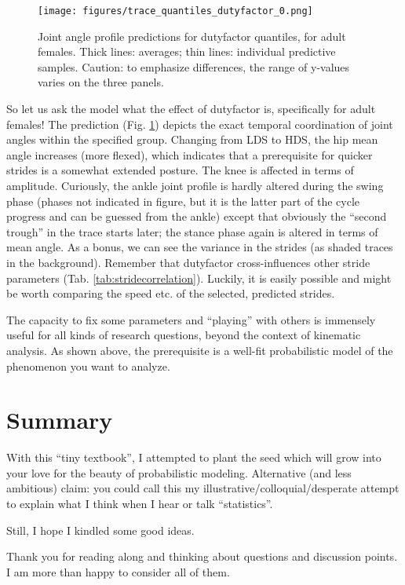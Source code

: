 \begin{figure}[htbp]
\centering
\texttt{[image: figures/trace\_quantiles\_dutyfactor\_0.png]}
\caption{\label{fig:dutyquantileprediction}Joint angle profile predictions for dutyfactor quantiles, for adult females. Thick lines: averages; thin lines: individual predictive samples. Caution: to emphasize differences, the range of y-values varies on the three panels.}
\end{figure}

So let us ask the model what the effect of dutyfactor is, specifically for adult females!
The prediction (Fig. \ref{fig:dutyquantileprediction}) depicts the exact temporal coordination of joint angles within the specified group.
Changing from LDS to HDS, the hip mean angle increases (more flexed), which indicates that a prerequisite for quicker strides is a somewhat extended posture.
The knee is affected in terms of amplitude.
Curiously, the ankle joint profile is hardly altered during the swing phase (phases not indicated in figure, but it is the latter part of the cycle progress and can be guessed from the ankle) except that obviously the ``second trough'' in the trace starts later; the stance phase again is altered in terms of mean angle.
As a bonus, we can see the variance in the strides (as shaded traces in the background).
Remember that dutyfactor cross-influences other stride parameters (Tab. \ref{tab:stridecorrelation}).
Luckily, it is easily possible and might be worth comparing the speed etc. of the selected, predicted strides.


The capacity to fix some parameters and ``playing'' with others is immensely useful for all kinds of research questions, beyond the context of kinematic analysis.
As shown above, the prerequisite is a well-fit probabilistic model of the phenomenon you want to analyze.



\FloatBarrier
\clearpage
\section{Summary}
\label{sec:org527d8db}
With this ``tiny textbook'', I attempted to plant the seed which will grow into your love for the beauty of probabilistic modeling.
Alternative (and less ambitious) claim: you could call this my illustrative/colloquial/desperate attempt to explain what I think when I hear or talk ``statistics''.

Still, I hope I kindled some good ideas.
\medskip

Thank you for reading along and thinking about questions and discussion points.
I am more than happy to consider all of them.



\FloatBarrier
\clearpage

\nocite{Gelman2013}



